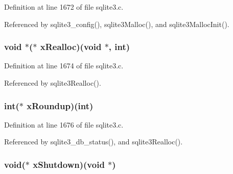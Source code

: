 Definition at line 1672 of file sqlite3.\+c.



Referenced by sqlite3\+\_\+config(), sqlite3\+Malloc(), and sqlite3\+Malloc\+Init().

\hypertarget{structsqlite3__mem__methods_a10a9a571a4b40370c8f684e3dfbd9aed}{}
\subsubsection[{x\+Realloc}]{\setlength{\rightskip}{0pt plus 5cm}void $\ast$($\ast$ x\+Realloc)(void $\ast$, int)}\label{structsqlite3__mem__methods_a10a9a571a4b40370c8f684e3dfbd9aed}


Definition at line 1674 of file sqlite3.\+c.



Referenced by sqlite3\+Realloc().

\hypertarget{structsqlite3__mem__methods_a02b48fb7c072d77a055859d16cd94077}{}
\subsubsection[{x\+Roundup}]{\setlength{\rightskip}{0pt plus 5cm}int($\ast$ x\+Roundup)(int)}\label{structsqlite3__mem__methods_a02b48fb7c072d77a055859d16cd94077}


Definition at line 1676 of file sqlite3.\+c.



Referenced by sqlite3\+\_\+db\+\_\+status(), and sqlite3\+Realloc().

\hypertarget{structsqlite3__mem__methods_a34a88425495f42099aadbe3fa9676a06}{}
\subsubsection[{x\+Shutdown}]{\setlength{\rightskip}{0pt plus 5cm}void($\ast$ x\+Shutdown)(void $\ast$)}\label{structsqlite3__mem__methods_a34a88425495f42099aadbe3fa9676a06}


